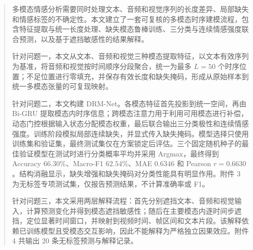 \begin{abstract}
多模态情感分析需要同时处理文本、音频和视觉序列的长度差异、局部缺失和情感标签的不确定性。本文建立了一套可复核的多模态时序建模流程，包含特征提取与统一长度处理、缺失模态鲁棒训练、三分类与连续情感强度联合预测，以及基于遮挡敏感性的结果解释。

针对问题一，本文从文本、音频和视觉三种模态提取特征，以文本有效序列为基准，将音频和视觉按时间顺序分段聚合，统一为最多 $L=50$ 个时序位置；不足位置进行零填充，并保存有效长度和缺失掩码，形成从原始样本到统一多模态张量的可复现映射。

针对问题二，本文构建 DRM-Net。各模态特征首先投影到统一空间，再由 Bi-GRU 提取模态内时序信息；跨模态注意力用于利用可用模态进行补偿，动态门控根据输入状态分配模态权重，最后联合输出三分类极性和连续情感强度。训练阶段模拟局部连续缺失，并显式传入缺失掩码。模型选择只使用训练集和验证集，最终测试集仅在方案锁定后评估。三个固定随机种子的最佳验证模型在测试时进行分类概率平均并采用 Argmax，最终得到 Accuracy $66.30\%$、Macro-F1 $62.54\%$、MAE $0.6346$ 和 Pearson $r=0.6630$。结构消融显示，缺失增强和缺失掩码对分类性能具有明显作用。附件 3 为无标签专项测试集，仅报告预测结果，不计算准确率或 F1。

针对问题三，本文采用两层解释流程：首先分别遮挡文本、音频和视觉输入，计算预测变化并得到模态遮挡敏感性；随后在主要模态内逐时间步遮挡，定位显著时间窗口，并映射到视频时间、帧区间和文本片段。该解释依赖已训练模型且受模态交互影响，因此不能解释为严格独立因果效应。附件 4 共输出 20 条无标签预测与解释记录。

\end{abstract}
